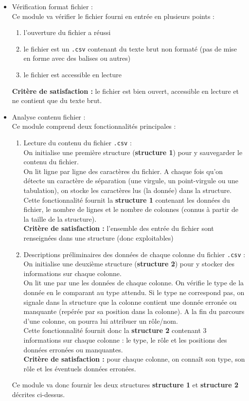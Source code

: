 			\begin{itemize}
			\item Vérification format fichier :\\
				Ce module va vérifier le fichier fourni en entrée en plusieurs points :
				\begin{enumerate}
					\item l'ouverture du fichier a réussi
					\item le fichier est un \lstinline!.csv! contenant du texte brut non formaté (pas de mise en forme avec des balises ou autres)
					\item le fichier est accessible en lecture
				\end{enumerate}
				\textbf{Critère de satisfaction : } le fichier est bien ouvert, accessible en lecture et ne contient que du texte brut.
			
			\item Analyse contenu fichier :\\
				Ce module comprend deux fonctionnalités principales :
				\begin{enumerate}
					\item Lecture du contenu du fichier \lstinline!.csv! :\\
					On initialise une première structure (\textbf{structure 1}) pour y sauvegarder le contenu du fichier.\\
					On lit ligne par ligne des caractères du fichier. A chaque fois qu'on détecte un caractère de séparation (une virgule, un point-virgule ou une tabulation), on stocke les caractères lus (la donnée) dans la structure.\\
					Cette fonctionnalité fournit la \textbf{structure 1} contenant les données du fichier, le nombre de lignes et le nombre de colonnes (connus à partir de la taille de la structure).\\
					\textbf{Critère de satisfaction : } l'ensemble des entrée du fichier sont renseignées dans une structure (donc exploitables)
					\item Descriptions préliminaires des données de chaque colonne du fichier \lstinline!.csv! :\\
					On initialise une deuxième structure (\textbf{structure 2}) pour y stocker des informations sur chaque colonne.\\
					On lit une par une les données de chaque colonne. On vérifie le type de la donnée en le comparant au type attendu. Si le type ne correspond pas, on signale dans la structure que la colonne contient une donnée erronée ou manquante (repérée par sa position dans la colonne). A la fin du parcours d'une colonne, on pourra lui attribuer un rôle/nom.\\
					Cette fonctionnalité fournit donc la \textbf{structure 2} contenant 3 informations sur chaque colonne : le type, le rôle et les positions des données erronées ou manquantes.\\
					\textbf{Critère de satisfaction : } pour chaque colonne, on connaît son type, son rôle et les éventuels données erronées.
				\end{enumerate}
				Ce module va donc fournir les deux structures \textbf{structure 1} et \textbf{structure 2} décrites ci-dessus.
				

\end{itemize}
